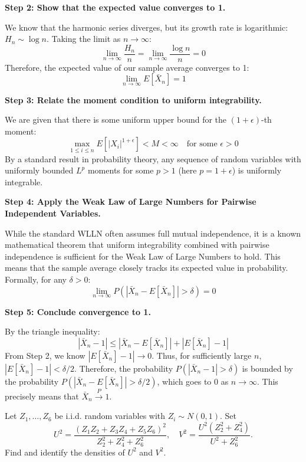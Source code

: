 \begin{solution}
\textbf{Step 2: Show that the expected value converges to 1.}

We know that the harmonic series diverges, but its growth rate is logarithmic: $H_n \sim \log n$.
Taking the limit as $n \to \infty$:
\[ \lim_{n \to \infty} \frac{H_n}{n} = \lim_{n \to \infty} \frac{\log n}{n} = 0 \]
Therefore, the expected value of our sample average converges to 1:
\[ \lim_{n \to \infty} E[\bar{X}_n] = 1 \]

\textbf{Step 3: Relate the moment condition to uniform integrability.}

We are given that there is some uniform upper bound for the $(1+\epsilon)$-th moment:
\[ \max_{1 \leq i \leq n} E[|X_i|^{1+\epsilon}] < M < \infty \quad \text{for some } \epsilon > 0 \]
By a standard result in probability theory, any sequence of random variables with uniformly bounded $L^p$ moments for some $p > 1$ (here $p = 1+\epsilon$) is uniformly integrable. 

\textbf{Step 4: Apply the Weak Law of Large Numbers for Pairwise Independent Variables.}

While the standard WLLN often assumes full mutual independence, it is a known mathematical theorem that uniform integrability combined with pairwise independence is sufficient for the Weak Law of Large Numbers to hold.
This means that the sample average closely tracks its expected value in probability. Formally, for any $\delta > 0$:
\[ \lim_{n \to \infty} P(|\bar{X}_n - E[\bar{X}_n]| > \delta) = 0 \]

\textbf{Step 5: Conclude convergence to 1.}

By the triangle inequality:
\[ |\bar{X}_n - 1| \leq |\bar{X}_n - E[\bar{X}_n]| + |E[\bar{X}_n] - 1| \]
From Step 2, we know $|E[\bar{X}_n] - 1| \to 0$. Thus, for sufficiently large $n$, $|E[\bar{X}_n] - 1| < \delta/2$.
Therefore, the probability $P(|\bar{X}_n - 1| > \delta)$ is bounded by the probability $P(|\bar{X}_n - E[\bar{X}_n]| > \delta/2)$, which goes to 0 as $n \to \infty$. 
This precisely means that $\bar{X}_n \xrightarrow{P} 1$.
\end{solution}

\begin{exercise}\label{probability:2010:3}
Let $Z_1, \dots, Z_6$ be i.i.d. random variables with $Z_i \sim N(0, 1)$. Set
\[ U^2 = \frac{(Z_1 Z_2 + Z_3 Z_4 + Z_5 Z_6)^2}{Z_2^2 + Z_4^2 + Z_6^2}, \quad V^2 = \frac{U^2 (Z_2^2 + Z_4^2)}{U^2 + Z_6^2}. \]
Find and identify the densities of $U^2$ and $V^2$.
\end{exercise}

